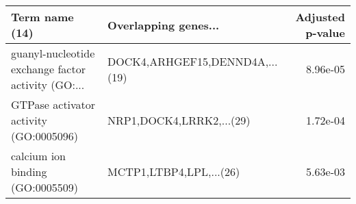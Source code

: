 \begin{tabular}{llr}
\toprule
                                    Term name (14) &           Overlapping genes... &  Adjusted p-value \\
\midrule
guanyl-nucleotide exchange factor activity (GO:... & DOCK4,ARHGEF15,DENND4A,...(19) &          8.96e-05 \\
            GTPase activator activity (GO:0005096) &       NRP1,DOCK4,LRRK2,...(29) &          1.72e-04 \\
                  calcium ion binding (GO:0005509) &        MCTP1,LTBP4,LPL,...(26) &          5.63e-03 \\
\bottomrule
\end{tabular}
